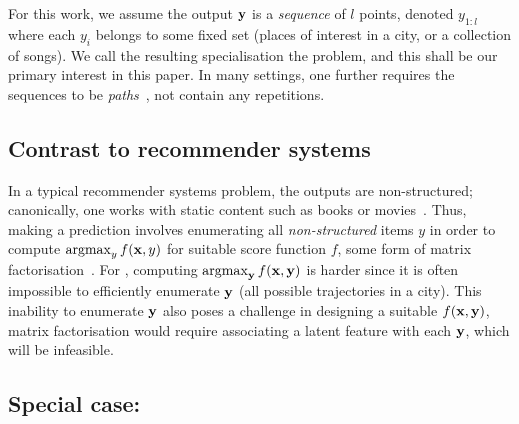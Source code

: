 For this work, we assume the output $\mathbf{y}$ is a \emph{sequence} of $l$ points, denoted $y_{1:l}$
where each $y_i$ belongs to some fixed set (\eg places of interest in a city, or a collection of songs).
We call the resulting specialisation the \emph{{\seqrec}} problem,
and this shall be our primary interest in this paper.
In many settings, one further requires the sequences to be \emph{paths}~\cite{west2001introduction}, \ie not contain any repetitions.



%
\subsection{Contrast to recommender systems}

%
In a typical recommender systems problem, the outputs are non-structured; canonically, one works with {static} content such as books or movies~\citep{Goldberg:1992,Sarwar:2001,Netflix}.
Thus, making a prediction involves enumerating all {\em non-structured} items $y$ in order to compute $\operatorname*{argmax}_y f(\mathbf{x},y)$ for suitable score function $f$, \eg some form of matrix factorisation~\citep{Koren:2009}.
For {\seqrec}, computing $\operatorname*{argmax}_{\mathbf{y}} f(\mathbf{x},\mathbf{y})$ is harder since it is often impossible to efficiently enumerate $\mathbf{y}$ (\eg all possible trajectories in a city).
This inability to enumerate $\mathbf{y}$ also poses a challenge in designing a suitable $f(\mathbf{x},\mathbf{y})$,
\eg
matrix factorisation
would require associating a latent feature with each $\mathbf{y}$, which will be infeasible.



%
\subsection{Special case: {\trajrec}}

